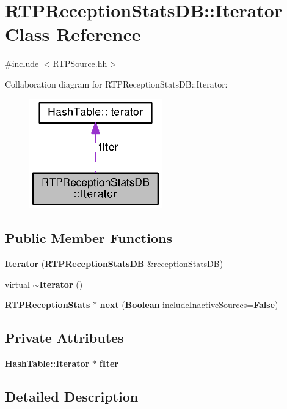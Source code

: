 \section{R\+T\+P\+Reception\+Stats\+D\+B\+:\+:Iterator Class Reference}
\label{classRTPReceptionStatsDB_1_1Iterator}


{\ttfamily \#include $<$R\+T\+P\+Source.\+hh$>$}



Collaboration diagram for R\+T\+P\+Reception\+Stats\+D\+B\+:\+:Iterator\+:
\nopagebreak
\begin{figure}[H]
\begin{center}
\leavevmode
\includegraphics[width=163pt]{classRTPReceptionStatsDB_1_1Iterator__coll__graph}
\end{center}
\end{figure}
\subsection*{Public Member Functions}
\begin{DoxyCompactItemize}
\item 
{\bf Iterator} ({\bf R\+T\+P\+Reception\+Stats\+D\+B} \&reception\+Stats\+D\+B)
\item 
virtual {\bf $\sim$\+Iterator} ()
\item 
{\bf R\+T\+P\+Reception\+Stats} $\ast$ {\bf next} ({\bf Boolean} include\+Inactive\+Sources={\bf False})
\end{DoxyCompactItemize}
\subsection*{Private Attributes}
\begin{DoxyCompactItemize}
\item 
{\bf Hash\+Table\+::\+Iterator} $\ast$ {\bf f\+Iter}
\end{DoxyCompactItemize}


\subsection{Detailed Description}


